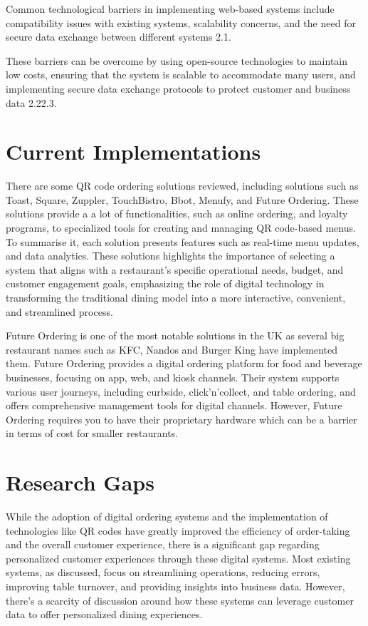 Common technological barriers in implementing web-based systems include compatibility issues with existing systems, scalability concerns, and the need for secure data exchange between different systems 2.1.

These barriers can be overcome by using open-source technologies to maintain low costs, ensuring that the system is scalable to accommodate many users, and implementing secure data exchange protocols to protect customer and business data 2.22.3. 

\section{Current Implementations}
There are some QR code ordering solutions reviewed, including solutions such as Toast, Square, Zuppler, TouchBistro, Bbot, Menufy, and Future Ordering. These solutions provide a a lot of functionalities, such as online ordering, and loyalty programs, to specialized tools for creating and managing QR code-based menus. To summarise it, each solution presents features such as real-time menu updates, and data analytics. These solutions highlights the importance of selecting a system that aligns with a restaurant's specific operational needs, budget, and customer engagement goals, emphasizing the role of digital technology in transforming the traditional dining model into a more interactive, convenient, and streamlined process.

Future Ordering is one of the most notable solutions in the UK as several big restaurant names such as KFC, Nandos and Burger King have implemented them. Future Ordering provides a digital ordering platform for food and beverage businesses, focusing on app, web, and kiosk channels. Their system supports various user journeys, including curbside, click’n’collect, and table ordering, and offers comprehensive management tools for digital channels. However, Future Ordering requires you to have their proprietary hardware which can be a barrier in terms of cost for smaller restaurants.

\section{Research Gaps}

While the adoption of digital ordering systems and the implementation of technologies like QR codes have greatly improved the efficiency of order-taking and the overall customer experience, there is a significant gap regarding personalized customer experiences through these digital systems. Most existing systems, as discussed, focus on streamlining operations, reducing errors, improving table turnover, and providing insights into business data. However, there's a scarcity of discussion around how these systems can leverage customer data to offer personalized dining experiences.

